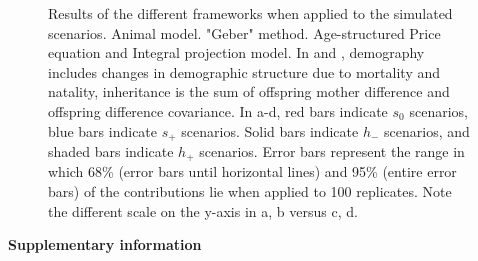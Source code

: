 \begin{figure}
\caption{Results of the different frameworks when applied to the simulated scenarios.  Animal model.  "Geber" method.  Age-structured Price equation and  Integral projection model. In  and , demography includes changes in demographic structure due to mortality and natality, inheritance is the sum of offspring mother difference and offspring difference covariance. In a-d, red bars indicate $s_0$ scenarios, blue bars indicate $s_+$ scenarios. Solid bars indicate $h_{-}$ scenarios, and shaded bars indicate $h_{+}$ scenarios. Error bars represent the range in which 68\% (error bars until horizontal lines) and 95\% (entire error bars) of the contributions lie when applied to 100 replicates. Note the different scale on the y-axis in a, b versus c, d.}
\label{frameworkresults}
\end{figure}


\printbibliography[heading=subbibliography]

\newpage
\textbf{\LARGE{Supplementary information}}